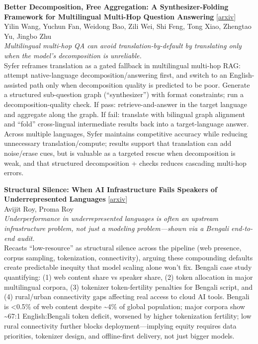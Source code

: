 \documentclass[12pt,letterpaper]{article}
\begin{document}
\medskip

{\small\textbf{Better Decomposition, Free Aggregation: A Synthesizer-Folding Framework for Multilingual Multi-Hop Question Answering}} {\scriptsize[\href{https://arxiv.org/abs/2608.13160}{arxiv}]}\\
{\scriptsize Yilin Wang, Yuchun Fan, Weidong Bao, Zili Wei, Shi Feng, Tong Xiao, Zhengtao Yu, Jingbo Zhu}\\

{\small\textit{Multilingual multi-hop QA can avoid translation-by-default by translating only when the model's decomposition is unreliable.}}\\[1pt]
{\footnotesize Syfer reframes translation as a gated fallback in multilingual multi-hop RAG: attempt native-language decomposition/answering first, and switch to an English-assisted path only when decomposition quality is predicted to be poor. Generate a structured sub-question graph (``synthesizer'') with format constraints; run a decomposition-quality check. If pass: retrieve-and-answer in the target language and aggregate along the graph. If fail: translate with bilingual graph alignment and ``fold'' cross-lingual intermediate results back into a target-language answer. Across multiple languages, Syfer maintains competitive accuracy while reducing unnecessary translation/compute; results support that translation can add noise/erase cues, but is valuable as a targeted rescue when decomposition is weak, and that structured decomposition + checks reduces cascading multi-hop errors.}

\medskip

{\small\textbf{Structural Silence: When AI Infrastructure Fails Speakers of Underrepresented Languages}} {\scriptsize[\href{https://arxiv.org/abs/2608.12278}{arxiv}]}\\
{\scriptsize Avijit Roy, Proma Roy}\\

{\small\textit{Underperformance in underrepresented languages is often an upstream infrastructure problem, not just a modeling problem---shown via a Bengali end-to-end audit.}}\\[1pt]
{\footnotesize Recasts ``low-resource'' as structural silence across the pipeline (web presence, corpus sampling, tokenization, connectivity), arguing these compounding defaults create predictable inequity that model scaling alone won't fix. Bengali case study quantifying: (1) web content share vs speaker share, (2) token allocation in major multilingual corpora, (3) tokenizer token-fertility penalties for Bengali script, and (4) rural/urban connectivity gaps affecting real access to cloud AI tools. Bengali is <0.5\% of web content despite \textasciitilde{}4\% of global population; major corpora show \textasciitilde{}67:1 English:Bengali token deficit, worsened by higher tokenization fertility; low rural connectivity further blocks deployment---implying equity requires data priorities, tokenizer design, and offline-first delivery, not just bigger models.}
\end{document}
